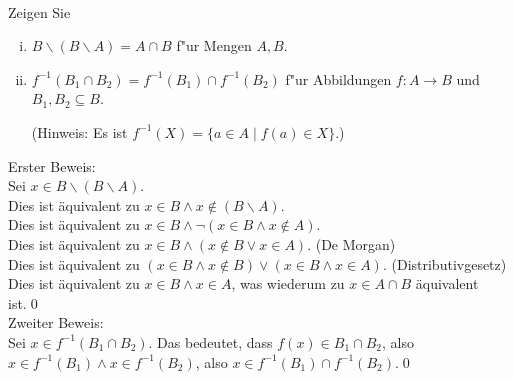\\
Zeigen Sie
\begin{enumerate}[(i)]
    \item $B\backslash (B\backslash A)=A\cap B$ f"ur Mengen $A,B$.
    \item $f^{-1}(B_1\cap B_2)=f^{-1}(B_1)\cap f^{-1}(B_2)$ f"ur Abbildungen $f:A\to B$ und $B_1,B_2\subseteq B$. 
    
    (Hinweis: Es ist $f^{-1}(X)=\{a\in A\mid f(a)\in X\}$.)
\end{enumerate}
\begin{loesung}
Erster Beweis:\\
Sei $x\in B\backslash (B\backslash A)$.\\
Dies ist äquivalent zu $x\in B\wedge x\notin (B\backslash A)$.\\
Dies ist äquivalent zu $x\in B\wedge \neg (x\in B\wedge x\notin A)$.\\
Dies ist äquivalent zu $x\in B\wedge (x\notin B\vee x\in A)$. (De Morgan)\\
Dies ist äquivalent zu $(x\in B\wedge x\notin B)\vee (x\in B\wedge x\in A)$. (Distributivgesetz)\\
Dies ist äquivalent zu $x\in B\wedge x\in A$, was wiederum zu $x\in A\cap B$ äquivalent ist.\qed\\
Zweiter Beweis:\\
Sei $x\in f^{-1}(B_1\cap B_2)$. Das bedeutet, dass $f(x)\in B_1\cap B_2$, also $x\in f^{-1}(B_1)\wedge x\in f^{-1}(B_2)$, also $x\in f^{-1}(B_1)\cap f^{-1}(B_2)$.\qed
\end{loesung}
